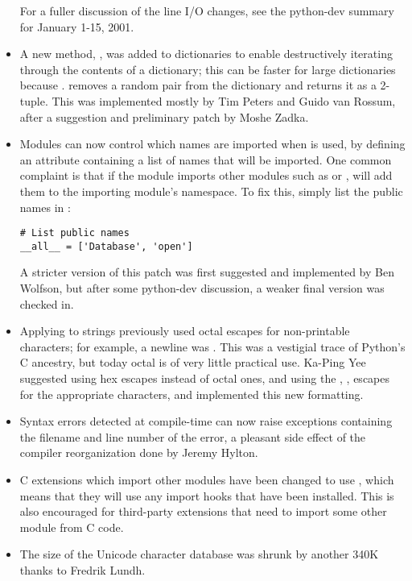 \documentclass{howto}
\begin{document}
\begin{itemize}
For a fuller discussion of the line I/O changes, see the python-dev
summary for January 1-15, 2001.

\item A new method, , was added to dictionaries to
enable destructively iterating through the contents of a dictionary;
this can be faster for large dictionaries because .
 removes a random 
pair from the dictionary and returns it as a 2-tuple.  This was
implemented mostly by Tim Peters and Guido van Rossum, after a
suggestion and preliminary patch by Moshe Zadka.
 
\item Modules can now control which names are imported when  is used, by defining an 
attribute containing a list of names that will be imported.  One
common complaint is that if the module imports other modules such as
 or , 
will add them to the importing module's namespace.  To fix this,
simply list the public names in :

\begin{verbatim}
# List public names
__all__ = ['Database', 'open']
\end{verbatim}

A stricter version of this patch was first suggested and implemented
by Ben Wolfson, but after some python-dev discussion, a weaker final
version was checked in.

\item Applying  to strings previously used octal
escapes for non-printable characters; for example, a newline was
.  This was a vestigial trace of Python's C ancestry, but
today octal is of very little practical use.  Ka-Ping Yee suggested
using hex escapes instead of octal ones, and using the ,
,  escapes for the appropriate characters, and
implemented this new formatting.

\item Syntax errors detected at compile-time can now raise exceptions
containing the filename and line number of the error, a pleasant side
effect of the compiler reorganization done by Jeremy Hylton.

\item C extensions which import other modules have been changed to use
, which means that they will use any
import hooks that have been installed.  This is also encouraged for
third-party extensions that need to import some other module from C
code.  

\item The size of the Unicode character database was shrunk by another
340K thanks to Fredrik Lundh.

\end{itemize}
\end{document}
